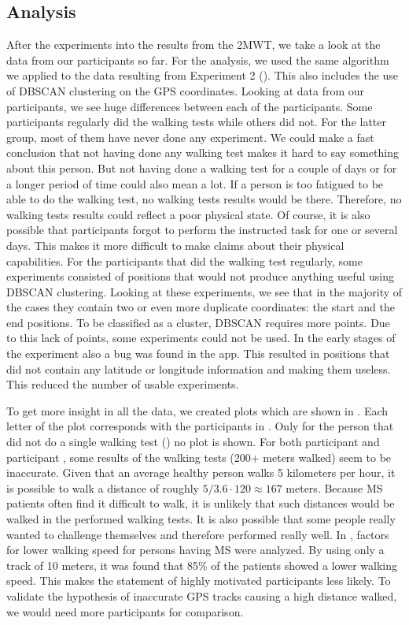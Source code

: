 \subsection{Analysis}
After the experiments into the results from the 2MWT, we take a look at the data from our participants so far.
For the analysis, we used the same algorithm we applied to the data resulting from Experiment 2 (). This also includes the use of DBSCAN clustering on the GPS coordinates.
Looking at data from our participants, we see huge differences between each of the participants.
Some participants regularly did the walking tests while others did not.
For the latter group, most of them have never done any experiment.
We could make a fast conclusion that not having done any walking test makes it hard to say something about this person.
But not having done a walking test for a couple of days or for a longer period of time could also mean a lot.
If a person is too fatigued to be able to do the walking test, no walking tests results would be there.
Therefore, no walking tests results could reflect a poor physical state.
Of course, it is also possible that participants forgot to perform the instructed task for one or several days.
This makes it more difficult to make claims about their physical capabilities.
For the participants that did the walking test regularly, some experiments consisted of positions that would not produce anything useful using DBSCAN clustering.
Looking at these experiments, we see that in the majority of the cases they contain two or even more duplicate coordinates: the start and the end positions. 
To be classified as a cluster, DBSCAN requires more points.
Due to this lack of points, some experiments could not be used.
In the early stages of the experiment also a bug was found in the app.
This resulted in positions that did not contain any latitude or longitude information and making them useless.
This reduced the number of usable experiments.

To get more insight in all the data, we created plots which are shown in .
Each letter of the plot corresponds with the participants in . 
Only for the person that did not do a single walking test () no plot is shown.
For both participant  and participant , some results of the walking tests (200+ meters walked) seem to be inaccurate. 
Given that an average healthy person walks 5 kilometers per hour, it is possible to walk a distance of roughly $5/3.6 \cdot 120 \approx 167$ meters. 
Because MS patients often find it difficult to walk, it is unlikely that such distances would be walked in the performed walking tests.
It is also possible that some people really wanted to challenge themselves and therefore performed really well.
In \cite{nogueira2013factors}, factors for lower walking speed for persons having MS were analyzed.
By using only a track of 10 meters, it was found that 85\% of the patients showed a lower walking speed.
This makes the statement of highly motivated participants less likely.
To validate the hypothesis of inaccurate GPS tracks causing a high distance walked, we would need more participants for comparison.

